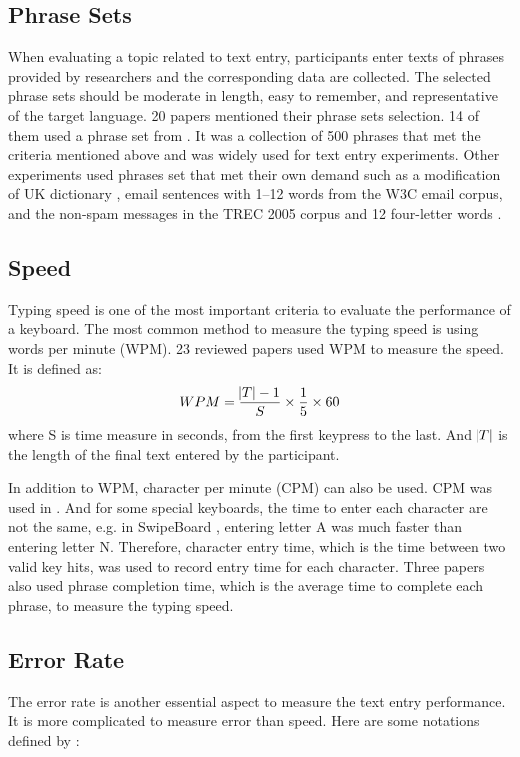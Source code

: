 \documentclass[11pt]{article}
\begin{document}
\subsection{Phrase Sets}
When evaluating a topic related to text entry, participants enter texts of phrases provided by researchers and the corresponding data are collected. The selected phrase sets should be moderate in length, easy to remember, and representative of the target language. 20 papers mentioned their phrase sets selection. 14 of them used a phrase set from \citep{10.1145/765891.765971}. It was a collection of 500 phrases that met the criteria mentioned above and was widely used for text entry experiments. Other experiments used phrases set that met their own demand such as a modification of UK dictionary \citep{6926662}, email sentences with 1–12 words from the W3C email corpus, and the non-spam messages in the TREC 2005 corpus \citep{10.1145/2702123.2702135} and 12 four-letter words \citep{10.1145/2642918.2647354}.

\subsection{Speed}
Typing speed is one of the most important criteria to evaluate the performance of a keyboard. The most common method to measure the typing speed is using words per minute (WPM). 23 reviewed papers used WPM to measure the speed. It is defined as: $$WPM=\frac{\abs{T}-1}{S}\times \frac{1}{5}\times 60$$ where S is time measure in seconds, from the first keypress to the last. And $\abs{T}$ is the length of the final text entered by the participant.

In addition to WPM, character per minute (CPM) can also be used. CPM was used in \citep{10.1145/1753326.1753367}. And for some special keyboards, the time to enter each character are not the same, e.g. in SwipeBoard \citep{10.1145/2642918.2647354}, entering letter A was much faster than entering letter N. Therefore, character entry time, which is the time between two valid key hits, was used to record entry time for each character. Three papers \citep{10.1145/1357054.1357300, 6926662, 10.1145/1753326.1753367} also used phrase completion time, which is the average time to complete each phrase, to measure the typing speed.

\subsection{Error Rate}
The error rate is another essential aspect to measure the text entry performance. It is more complicated to measure error than speed. Here are some notations defined by \citep{10.1145/642611.642632}:
\end{document}
